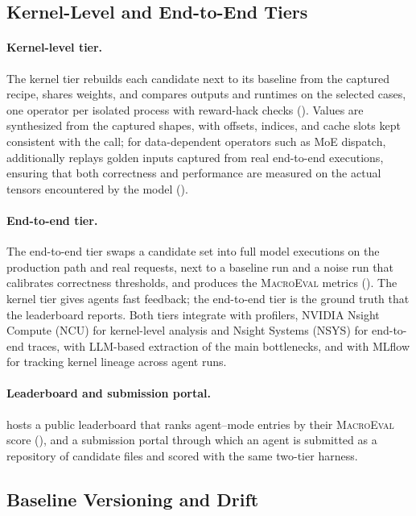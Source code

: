 \subsection{Kernel-Level and End-to-End Tiers}
\label{fastkernels:sec:tiers}

\paragraph{Kernel-level tier.}
The kernel tier rebuilds each candidate next to its baseline from the captured recipe, shares weights, and compares outputs and runtimes on the selected cases, one operator per isolated process with reward-hack checks ().
Values are synthesized from the captured shapes, with offsets, indices, and cache slots kept consistent with the call; for data-dependent operators such as MoE dispatch, \FastKernels additionally replays golden inputs captured from real end-to-end executions, ensuring that both correctness and performance are measured on the actual tensors encountered by the model ().

\paragraph{End-to-end tier.}
The end-to-end tier swaps a candidate set into full model executions on the production path and real requests, next to a baseline run and a noise run that calibrates correctness thresholds, and produces the \textsc{MacroEval} metrics ().
The kernel tier gives agents fast feedback; the end-to-end tier is the ground truth that the leaderboard reports.
Both tiers integrate with profilers, NVIDIA Nsight Compute (NCU) for kernel-level analysis and Nsight Systems (NSYS) for end-to-end traces, with LLM-based extraction of the main bottlenecks, and with MLflow for tracking kernel lineage across agent runs.

\paragraph{Leaderboard and submission portal.}
\FastKernels hosts a public leaderboard that ranks agent--mode entries by their \textsc{MacroEval} score (), and a submission portal through which an agent is submitted as a repository of candidate files and scored with the same two-tier harness.

\subsection{Baseline Versioning and Drift}
\label{fastkernels:sec:drift}


